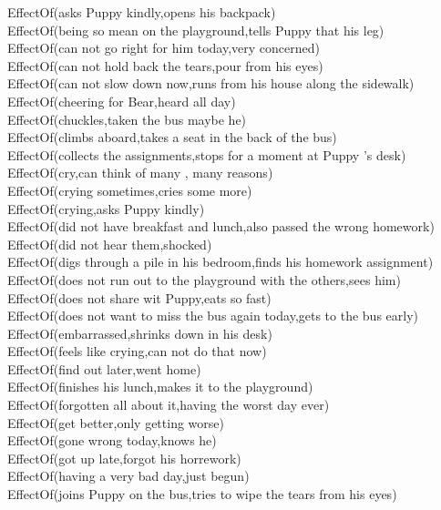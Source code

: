 \begin{multicols}{2}
\begin{footnotesize}
EffectOf(asks Puppy kindly,opens his backpack) \\
EffectOf(being so mean on the playground,tells Puppy that his leg) \\
EffectOf(can not go right for him today,very concerned) \\
EffectOf(can not hold back the tears,pour from his eyes) \\
EffectOf(can not slow down now,runs from his house along the sidewalk) \\
EffectOf(cheering for Bear,heard all day) \\
EffectOf(chuckles,taken the bus maybe he) \\
EffectOf(climbs aboard,takes a seat in the back of the bus) \\
EffectOf(collects the assignments,stops for a moment at Puppy 's desk) \\
EffectOf(cry,can think of many , many reasons) \\
EffectOf(crying sometimes,cries some more) \\
EffectOf(crying,asks Puppy kindly) \\
EffectOf(did not have breakfast and lunch,also passed the wrong homework) \\
EffectOf(did not hear them,shocked) \\
EffectOf(digs through a pile in his bedroom,finds his homework assignment) \\
EffectOf(does not run out to the playground with the others,sees him) \\
EffectOf(does not share wit Puppy,eats so fast) \\
EffectOf(does not want to miss the bus again today,gets to the bus early) \\
EffectOf(embarrassed,shrinks down in his desk) \\
EffectOf(feels like crying,can not do that now) \\
EffectOf(find out later,went home) \\
EffectOf(finishes his lunch,makes it to the playground) \\
EffectOf(forgotten all about it,having the worst day ever) \\
EffectOf(get better,only getting worse) \\
EffectOf(gone wrong today,knows he) \\
EffectOf(got up late,forgot his horrework) \\
EffectOf(having a very bad day,just begun) \\
EffectOf(joins Puppy on the bus,tries to wipe the tears from his eyes) \\

\end{footnotesize}
\end{multicols}
